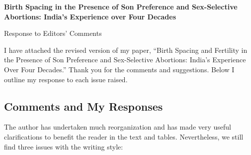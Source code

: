 \documentclass[letterpaper,12pt]{article}
\title{} \author{}
\begin{document}
\begin{center} \textbf{\large Birth Spacing in the Presence of Son
Preference and 
Sex-Selective Abortions: India's Experience over Four Decades}
\end{center}

\begin{center} Response to Editors' Comments \end{center}

\noindent I have attached the revised version of my paper,
``Birth Spacing and Fertility in the Presence of Son Preference and Sex-Selective
Abortions: India's Experience Over Four Decades.''
Thank you for the comments and suggestions. 
Below I outline my response to each issue raised.




\subsection*{Comments and My Responses}


The author has undertaken much reorganization and has made very useful clarifications to
benefit the reader in the text and tables. Nevertheless, we still find three issues with
the writing style:
\end{document}
